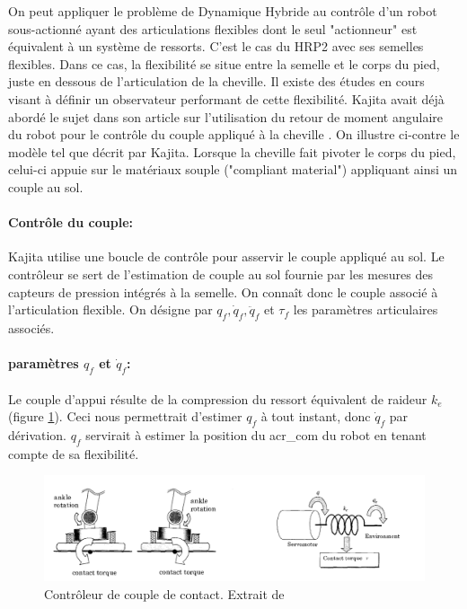 \documentclass{report}
\begin{document}
On peut appliquer le problème de Dynamique Hybride au contrôle d'un robot sous-actionné ayant des articulations flexibles dont le seul "actionneur" est équivalent à un système de ressorts. C'est le cas du HRP2 avec ses semelles flexibles. Dans ce cas, la flexibilité se situe entre la semelle et le corps du pied, juste en dessous de l'articulation de la cheville. Il existe des études en cours visant à définir un observateur performant de cette flexibilité. Kajita avait déjà abordé le sujet dans son article sur l'utilisation du retour de moment angulaire du robot pour le contrôle du couple appliqué à la cheville \cite{bib_backdrive}. On illustre ci-contre le modèle tel que décrit par Kajita. Lorsque la cheville fait pivoter le corps du pied, celui-ci appuie sur le matériaux souple ("compliant material") appliquant ainsi un couple au sol.
\paragraph{Contrôle du couple:} Kajita utilise une boucle de contrôle pour asservir le couple appliqué au sol. Le contrôleur se sert de l'estimation de couple au sol fournie par les mesures des capteurs de pression intégrés à la semelle. On connaît donc le couple associé à l'articulation flexible. On désigne par $q_f, \dot{q}_f, \ddot{q}_f$ et $\tau_f$ les paramètres articulaires associés.
\paragraph{paramètres $q_f$ et $\dot{q}_f$:} Le couple d'appui résulte de la compression du ressort équivalent de raideur $k_e$ (figure \ref{fig_hrp2ankle}). Ceci nous permettrait d'estimer $q_f$ à tout instant, donc $\dot{q}_f$ par dérivation. $q_f$ servirait à estimer la position du \gls{acr_com} du robot en tenant compte de sa flexibilité.

\begin{figure}[H]
  \centering
  \includegraphics[width=\textwidth]{figs/contactTorque.png}
  \caption{Contrôleur de couple de contact. Extrait de \cite[figure 2,3]{bib_backdrive}}
  \label{fig_hrp2ankle}
\end{figure}
\end{document}
